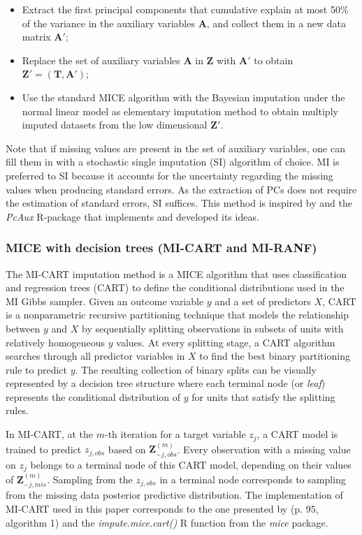 	\begin{itemize}

	\item Extract the first principal components that cumulative explain at most 50\% of the variance 
		in the auxiliary variables $\bm{A}$, and collect them in a new data matrix $\bm{A}'$;
	\item Replace the set of auxiliary variables $\bm{A}$ in $\bm{Z}$ with $\bm{A}'$ to obtain 
		$\bm{Z}' = (\bm{T}, \bm{A}')$;
	\item Use the standard MICE algorithm with the Bayesian imputation under the normal linear model 
		\citep[p. 68, algorithm 3.1]{vanBuuren:2018} as elementary imputation method to obtain multiply 
		imputed datasets from the low dimensional $\bm{Z}'$.
	\end{itemize}

	Note that if missing values are present in the set of auxiliary variables, one can fill them in with a 
	stochastic single imputation (SI) algorithm of choice.
	MI is preferred to SI because it accounts for the uncertainty regarding the missing values when producing 
	standard errors.
	As the extraction of PCs does not require the estimation of standard errors, SI suffices.
	This method is inspired by \cite{howardEtAl:2015} and the \emph{PcAux} R-package \citep{PcAux} that 
	implements and developed its ideas.
	
\subsubsection{MICE with decision trees (MI-CART and MI-RANF)}
	The MI-CART imputation method \citep{burgetteReiter:2010} is a MICE algorithm that uses classification and regression 
	trees (CART) to define the conditional distributions used in the MI Gibbs sampler.
	Given an outcome variable $y$ and a set of predictors $X$, CART is a nonparametric recursive partitioning technique 
	that models the relationship between $y$ and $X$ by sequentially splitting observations in subsets of units with 
	relatively homogeneous $y$ values.
	At every splitting stage, a CART algorithm searches through all predictor variables in $X$ to find the best binary 
	partitioning rule to predict $y$.
	The resulting collection of binary splits can be visually represented by a decision tree structure where each terminal 
	node (or \emph{leaf}) represents the conditional distribution of $y$ for units that satisfy the splitting rules.

	In MI-CART, at the $m$-th iteration for a target variable $z_j$, a CART model is trained to predict $z_{j, obs}$ based on 
	$\bm{Z}_{-j, obs}^{(m)}$.
	Every observation with a missing value on $z_j$ belongs to a terminal node of this CART model, depending on their values of
	$\bm{Z}_{-j, mis}^{(m)}$. 
	Sampling from the $z_{j, obs}$ in a terminal node corresponds to sampling from the missing data posterior predictive
	distribution.
	The implementation of MI-CART used in this paper corresponds to the one presented by \cite{dooveEtAl:2014}
	(p. 95, algorithm 1) and the \emph{impute.mice.cart()} R function from the \emph{mice} package.

